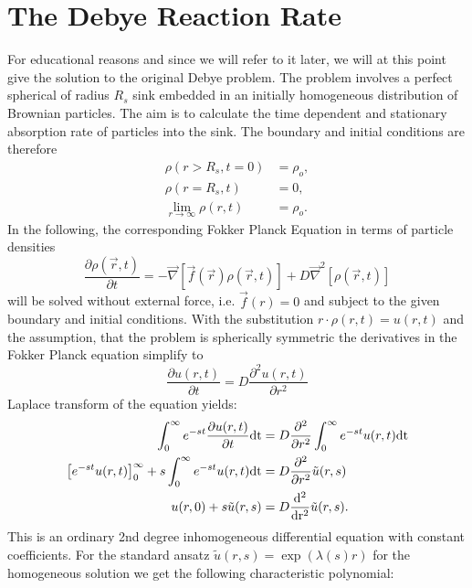 \section{The Debye Reaction Rate}
For educational reasons and since we will refer to it later, we will at this point give the solution to the original Debye problem.
The problem involves a perfect spherical of radius $R_s$ sink embedded in an initially homogeneous distribution of Brownian particles. The aim is to calculate the time dependent and stationary absorption rate of particles into the sink.
The boundary and initial conditions are therefore
\begin{align}
    \rho(r > R_s, t = 0) &= \rho_o, \\
    \rho(r=R_s,t) &= 0, \\
    \lim_{r \rightarrow \infty} \rho(r, t) &= \rho_o.
    \label{BC}
\end{align}
In the following, the corresponding Fokker Planck Equation in terms of particle densities
\begin{equation}
        \frac{\partial \rho(\vec{r},t)}{\partial t} = - \vec \nabla \left[ \vec f(\vec{r})\rho(\vec{r},t) \right] + D\vec \nabla ^2 \left[\rho(\vec{r},t) \right] 
    \label{FPE3}
\end{equation}
will be solved without external force, i.e. $\vec f(r) = 0$ and subject to the given boundary and initial conditions.
With the substitution $r \cdot \rho(r,t) = u(r,t)$ and the assumption, that the problem is spherically symmetric the derivatives in the Fokker Planck equation simplify to
\begin{equation}
    \frac{\partial u(r,t)}{\partial t} = D \frac{\partial ^2 u(r,t)}{\partial r^2}
    \label{Simplified FPE}
\end{equation}
Laplace transform of the equation yields:
\begin{align}
    \int_0^\infty e^{-st}\frac{\partial u(r,t)}{\partial t} \rm{d} t &= D \frac{\partial ^2 }{\partial r^2} \int_0^\infty e^{-st} u(r,t) \rm{d} t \\
    \left[e^{-st} u(r,t) \right]_0^\infty + s \int_0^\infty e^{-st} u(r,t) \rm{d} t &= D \frac{\partial^2}{\partial r^2} \tilde{u}(r,s)\\
    u(r,0) + s \tilde{u}(r,s) &= D \frac{\rm{d}^2}{\rm{d} r^2} \tilde{u}(r,s).
\end{align}
This is an ordinary 2nd degree inhomogeneous differential equation with constant coefficients.
For the standard ansatz $\tilde{u}(r,s) = \exp(\lambda(s) r)$ for the homogeneous solution we get the following characteristic polynomial:
